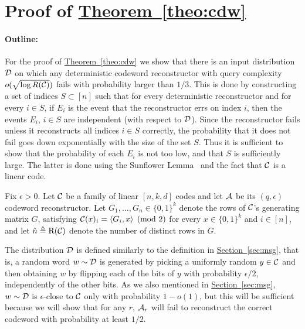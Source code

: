 \documentclass[10pt]{article}
\theoremstyle{definition}
\numberwithin{equation}{section}
\newcommand{\expref}[2]{\texorpdfstring{\hyperref[#2]{#1~\ref{#2}}}{#1~\ref{#2}}}
\newcommand{\ALG}{{\cal A}}
\newcommand{\DD}{{\cal D}}
\newcommand{\CC}{{\cal C}}
\newcommand{\zo}{{\{0,1\}}}
\newcommand{\nrows}{{\hat n }}
\newcommand{\drows}{{{\mathrm{R}} }}
\begin{document}
\section{Proof of \expref{Theorem}{theo:cdw}}

\paragraph{Outline:} For the proof of \expref{Theorem}{theo:cdw} we show that there is an input distribution $\DD$ on which any deterministic codeword reconstructor with query complexity $o(\sqrt{\log R(\CC)})$ fails with probability larger than $1/3$. This is done by constructing a set of indices $S\subset [n]$ such that for every deterministic reconstructor and for every $i\in S$, if $E_i$ is the event that the reconstructor errs on index $i$, then the events $E_i$, $i\in S$ are independent (with respect to $\DD$). Since the reconstructor fails unless it reconstructs all indices $i \in S$ correctly, the probability that it does not fail goes down exponentially with the size of the set $S$. Thus it is sufficient to show that the probability of each $E_i$ is not too low, and that $S$ is sufficiently large. The latter is done using the Sunflower Lemma~\cite{sunflower} and the fact that $\CC$ is a linear code.

Fix $\epsilon > 0$. Let $\CC$ be a family of linear $[n,k,d]$ codes and let $\ALG$ be its $(q,\epsilon)$ codeword reconstructor.
Let $G_1, \ldots, G_n \in \zo^k$ denote the rows of $\CC$'s generating matrix $G$, satisfying $\CC(x)_i = \langle G_i,x\rangle  \pmod{2}$ for every $x \in \zo^k$ and $i\in [n]$, and let $\nrows \triangleq \drows(\CC)$ denote the number of distinct rows in $G$.

The distribution $\DD$ is defined similarly to the definition in \expref{Section}{sec:msg}, that is, a random word $w\sim\DD$ is generated by picking a uniformly random $y \in \CC$ and then obtaining $w$ by flipping each of the bits of $y$ with probability $\epsilon/2$, independently of the other bits. As we also mentioned in \expref{Section}{sec:msg}, $w\sim \DD$ is $\epsilon$-close to $\CC$ only with probability $1-o(1)$, but this will be sufficient because we will show that for any $r$,  $\ALG_r$ will fail to reconstruct the correct codeword with probability at least $1/2$.
\end{document}
